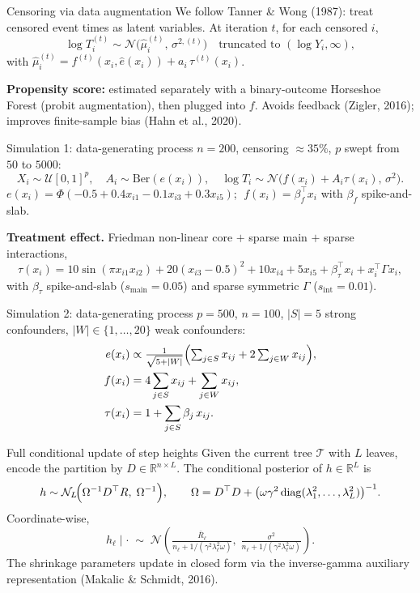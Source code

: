 \documentclass[10pt,aspectratio=169]{beamer}
\newcommand{\T}{\mathcal{T}}
\newcommand{\R}{\mathbb{R}}
\newcommand{\N}{\mathcal{N}}
\begin{document}
\begin{frame}{Censoring via data augmentation}
We follow Tanner \& Wong (1987): treat censored event times as latent variables.
At iteration $t$, for each censored $i$,
\[
\log T_i^{(t)} \sim \N\!\bigl(\hat\mu_i^{(t)},\,\sigma^{2,(t)}\bigr)
\quad\text{truncated to }(\log Y_i,\infty),
\]
with $\hat\mu_i^{(t)} = f^{(t)}(x_i,\hat e(x_i)) + a_i\,\tau^{(t)}(x_i)$.

\bigskip
\textbf{Propensity score:} estimated separately with a binary-outcome Horseshoe Forest (probit augmentation), then plugged into $f$. Avoids feedback (Zigler, 2016); improves finite-sample bias (Hahn et al., 2020).
\end{frame}

\begin{frame}{Simulation 1: data-generating process}
$n=200$, censoring $\approx 35\%$, $p$ swept from $50$ to $5000$:
\[
X_i \sim \mathcal{U}[0,1]^p,\quad A_i\sim\mathrm{Ber}(e(x_i)),\quad
\log T_i \sim \N\!\bigl(f(x_i)+A_i\tau(x_i),\,\sigma^2\bigr).
\]
$e(x_i)=\Phi(-0.5+0.4x_{i1}-0.1x_{i3}+0.3x_{i5})$; $\;f(x_i)=\beta_f^\top x_i$ with $\beta_f$ spike-and-slab.

\smallskip
\textbf{Treatment effect.} Friedman non-linear core $+$ sparse main $+$ sparse interactions,
\[
\tau(x_i)=10\sin(\pi x_{i1}x_{i2})+20(x_{i3}-0.5)^2+10x_{i4}+5x_{i5}+\beta_\tau^\top x_i + x_i^\top\Gamma x_i,
\]
with $\beta_\tau$ spike-and-slab ($s_{\mathrm{main}}=0.05$) and sparse symmetric $\Gamma$ ($s_{\mathrm{int}}=0.01$).
\end{frame}

\begin{frame}{Simulation 2: data-generating process}
$p=500$, $n=100$, $|S|=5$ strong confounders, $|W|\in\{1,\ldots,20\}$ weak confounders:
\begin{align*}
e(x_i)    &\propto \tfrac{1}{\sqrt{5+|W|}}\Bigl(\textstyle\sum_{j\in S} x_{ij} + 2\sum_{j\in W} x_{ij}\Bigr),\\
f(x_i)    &= 4\sum_{j\in S} x_{ij} + \sum_{j\in W} x_{ij},\\
\tau(x_i) &= 1 + \sum_{j\in S}\beta_j\,x_{ij}.
\end{align*}
\end{frame}

\begin{frame}{Full conditional update of step heights}
Given the current tree $\T$ with $L$ leaves, encode the partition by $D\in\R^{n\times L}$. The conditional posterior of $h\in\R^L$ is
\[
h \sim \N_L\!\Bigl(\Omega^{-1}D^\top R,\;\Omega^{-1}\Bigr),\qquad
\Omega = D^\top D + \bigl(\omega\gamma^2\,\mathrm{diag}(\lambda_1^2,\ldots,\lambda_L^2)\bigr)^{-1}.
\]
Coordinate-wise,
\[
h_\ell\mid\cdot \;\sim\;
\N\!\left(\tfrac{\bar R_\ell}{n_\ell+1/(\gamma^2\lambda_\ell^2\omega)},\;
          \tfrac{\sigma^2}{n_\ell+1/(\gamma^2\lambda_\ell^2\omega)}\right).
\]
The shrinkage parameters update in closed form via the inverse-gamma auxiliary representation (Makalic \& Schmidt, 2016).
\end{frame}
\end{document}
